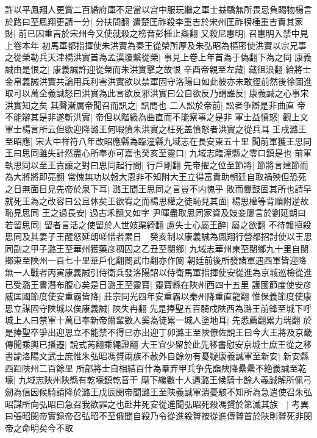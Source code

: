 許以平鳳翔人更賞二百緍府庫不足當以宫中服玩繼之軍士益驕無所畏忌負賜物楊言於路曰至鳳翔更請一分|{
	分扶問翻}
遣楚匡祚殺李重吉於宋州匡祚榜棰重吉責其家財|{
	前已囚重吉於宋州今又使就殺之榜音彭棰止橤翻}
又殺尼惠明|{
	召惠明入禁中見上卷本年}
初馬軍都指揮使朱洪實為秦王從榮所厚及朱弘昭為樞密使洪實以宗兄事之從榮勒兵天津橋洪實首為孟漢瓊繫從榮|{
	事見上卷上年首為于偽翻下為之同}
康義誠由是恨之|{
	康義誠許迎從榮而朱洪實擊之故恨}
辛酉帝親至左藏|{
	藏徂浪翻}
給將士金帛義誠洪實共論用兵利害洪實欲以禁軍固守洛陽曰如此彼亦未敢徑前然後徐圖進取可以萬全義誠怒曰洪實為此言欲反邪洪實曰公自欲反乃謂誰反|{
	康義誠之心事宋洪實知之矣}
其聲漸厲帝聞召而訊之|{
	訊問也}
二人訟於帝前|{
	訟者争辯是非曲直}
帝不能辯其是非遂斬洪實|{
	帝但以階級為曲直而不能察事之是非}
軍士益憤怒|{
	觀上文軍士楊言所云但欲迎降潞王何暇憤朱洪實之枉死盖憤怒者洪實之從兵耳}
壬戌潞王至昭應|{
	宋大中祥符八年改昭應縣為臨潼縣九域志在長安東五十里}
聞前軍獲王思同王曰思同雖失計然盡心所奉亦可嘉也癸亥至靈口|{
	九域志臨潼縣之零口鎮是也}
前軍執思同以至王責讓之對曰思同起行間|{
	行戶剛翻}
先帝擢之位至節將|{
	節將言建節而為大將將即亮翻}
常愧無功以報大恩非不知附大王立得富貴助朝廷自取禍殃但恐死之日無面目見先帝於泉下耳|{
	潞王聞王思同之言豈不内愧乎}
敗而釁鼓固其所也請早就死王為之改容曰公且休矣王欲宥之而楊思權之徒恥見其面|{
	楊思權等背順附逆故恥見思同}
王之過長安|{
	過古禾翻又如字}
尹暉盡取思同家資及妓妾屢言於劉延朗曰若留思同|{
	留者言活之使留於人世妓渠綺翻}
慮失士心屬王醉|{
	屬之欲翻}
不待報擅殺思同及其妻子王醒怒延朗嗟惜者累日　癸亥制以康義誠為鳳翔行營都招討使以王思同副之甲子潞王至華州獲藥彦稠囚之乙丑至閿鄉|{
	九域志華州東至閿鄉九十里自閿鄉東至陜州一百七十里華戶化翻閿武巾翻亦作閺}
朝廷前後所發諸軍遇西軍皆迎降無一人戰者丙寅康義誠引侍衛兵發洛陽詔以侍衛馬軍指揮使安從進為京城巡檢從進已受潞王書潛布腹心矣是日潞王至靈寶|{
	靈寶縣在陜州西四十五里}
護國節度使安彦威匡國節度使安重霸皆降|{
	莊宗同光四年安重霸以秦州降重直龍翻}
惟保義節度使康思立謀固守陜城以俟康義誠|{
	陜失冉翻}
先是捧聖五百騎戍陜西為潞王前鋒至城下呼城上人曰禁軍十萬已奉新帝爾輩數人奚為徒累一城人塗地耳|{
	先悉薦翻累力瑞翻}
於是捧聖卒爭出迎思立不能禁不得已亦出迎丁卯潞王至陜僚佐說王曰今大王將及京畿傳聞乘輿已播遷|{
	說式芮翻乘繩證翻}
大王宜少留於此先移書慰安京城士庶王從之移書諭洛陽文武士庶惟朱弘昭馮贇兩族不赦外自餘勿有憂疑康義誠軍至新安|{
	新安縣西距陜州二百餘里}
所部將士自相結百什為羣弃甲兵争先詣陜降纍纍不絶義誠至乾壕|{
	九域志陜州陜縣有乾壕鎮乾音干}
麾下纔數十人遇潞王候騎十餘人義誠解所佩弓劒為信因候騎請降於潞王戊辰閔帝聞潞王至陝義誠軍潰憂駭不知所為急遣使召朱弘昭謀所向弘昭曰急召我欲罪之也赴井死安從進聞弘昭死殺馮贇於第滅其族　|{
	考異曰張昭閔帝實録帝召弘昭不至俄聞自殺乃令從進殺贇按從進傳贇首於陜則贇死非閔帝之命明矣今不取}
